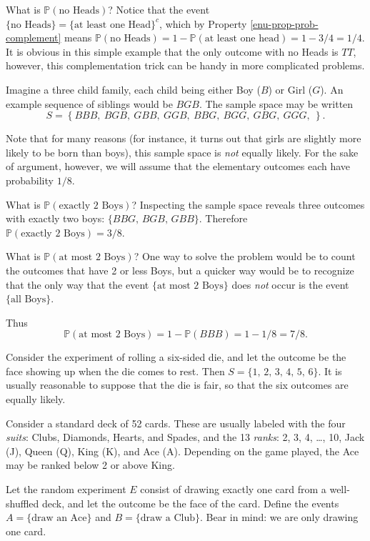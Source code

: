 What is \(\mathbb{P}(\mbox{no Heads})\)? Notice that the event \(\{
\mbox{no Heads} \} = \{ \mbox{at least one Head} \} ^{c}\), which by
Property \ref{enu-prop-prob-complement} means \(\mathbb{P}(\mbox{no
Heads})=1-\mathbb{P}(\mbox{at least one head})=1-3/4=1/4\). It is
obvious in this simple example that the only outcome with no Heads is
\(TT\), however, this complementation trick can be handy in more
complicated problems.


\label{exa-three-child-family} Imagine a three child family, each child
being either Boy (\(B\)) or Girl (\(G\)). An example sequence of
siblings would be \(BGB\). The sample space may be written \[ S =
\left\{ BBB,\ BGB,\ GBB,\ GGB,\ BBG,\ BGG,\ GBG,\ GGG,\ \right\}.\]

Note that for many reasons (for instance, it turns out that girls are
slightly more likely to be born than boys), this sample space is \emph{not}
equally likely. For the sake of argument, however, we will assume that
the elementary outcomes each have probability \(1/8\).

What is \(\mathbb{P}(\mbox{exactly 2 Boys})\)? Inspecting the sample
space reveals three outcomes with exactly two boys: \( \{ BBG,\,
BGB,\, GBB \} \).  Therefore \(\mathbb{P}(\mbox{exactly 2 Boys}) =
3/8\).

What is \(\mathbb{P}(\mbox{at most 2 Boys})\)? One way to solve the
problem would be to count the outcomes that have 2 or less Boys, but a
quicker way would be to recognize that the only way that the event
\(\{ \mbox{at most 2 Boys} \}\) does \emph{not} occur is the event \(\{
\mbox{all Boys} \}\).

Thus \[ \mathbb{P}(\mbox{at most 2 Boys}) = 1 - \mathbb{P}(BBB) = 1 -
1/8 = 7/8. \]




Consider the experiment of rolling a six-sided die, and let the
outcome be the face showing up when the die comes to rest. Then \( S =
\{ 1,\,2,\,3,\,4,\,5,\,6 \} \). It is usually reasonable to suppose
that the die is fair, so that the six outcomes are equally likely.



Consider a standard deck of 52 cards. These are usually labeled with
the four \emph{suits}: Clubs, Diamonds, Hearts, and Spades, and the 13
\emph{ranks}: 2, 3, 4, \ldots{}, 10, Jack (J), Queen (Q), King (K), and Ace
(A). Depending on the game played, the Ace may be ranked below 2 or
above King.

Let the random experiment \(E\) consist of drawing exactly one card
from a well-shuffled deck, and let the outcome be the face of the
card. Define the events \( A = \{ \mbox{draw an Ace} \} \) and \( B =
\{ \mbox{draw a Club} \} \). Bear in mind: we are only drawing one
card.

